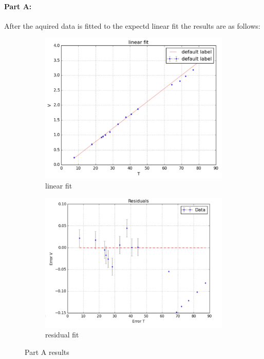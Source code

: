 \documentclass[12pt,a4paper]{report}
\begin{document}
\paragraph{Part A:}
After the aquired data is fitted to the expectd linear fit the results are as follows:
\begin{figure}[htbp]
    \centering
    \begin{subfigure}[b]{0.48\textwidth}
      \includegraphics[width=\textwidth]{Part A results/linear fit.png}
      \caption{linear fit}
      \label{fig:partA1}
    \end{subfigure}
    \hfill
    \begin{subfigure}[b]{0.48\textwidth}
      \includegraphics[width=\textwidth]{Part A results/res.png}
      \caption{residual fit}
      \label{fig:partA2}
    \end{subfigure}
    \caption{Part A results}
    \label{fig:partA_results}
  \end{figure}
  
\end{document}
